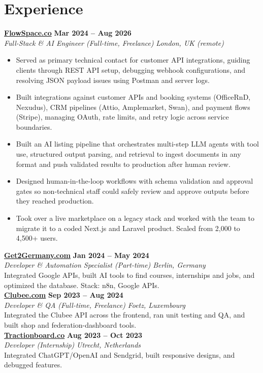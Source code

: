 \documentclass[a4paper,10pt]{article}
\newcommand{\role}[4]{%
 \textbf{#1} \hfill \textbf{#2}\\[1pt]%
 \textit{#3} \hfill \textit{#4}\\[2pt]%
}
\begin{document}
\section{Experience}

\role{\href{https://flowspace.co}{FlowSpace.co}}{Mar 2024 -- Aug 2026}{Full-Stack \& AI Engineer (Full-time, Freelance)}{London, UK (remote)}
\begin{itemize}
 \item Served as primary technical contact for customer API integrations, guiding clients through REST API setup, debugging webhook configurations, and resolving JSON payload issues using Postman and server logs.
 \item Built integrations against customer APIs and booking systems (OfficeRnD, Nexudus), CRM pipelines (Attio, Amplemarket, Swan), and payment flows (Stripe), managing OAuth, rate limits, and retry logic across service boundaries.
 \item Built an AI listing pipeline that orchestrates multi-step LLM agents with tool use, structured output parsing, and retrieval to ingest documents in any format and push validated results to production after human review.
 \item Designed human-in-the-loop workflows with schema validation and approval gates so non-technical staff could safely review and approve outputs before they reached production.
 \item Took over a live marketplace on a legacy stack and worked with the team to migrate it to a coded Next.js and Laravel product. Scaled from 2,000 to 4,500+ users.
\end{itemize}

\role{\href{https://get2germany.com}{Get2Germany.com}}{Jan 2024 -- May 2024}{Developer \& Automation Specialist (Part-time)}{Berlin, Germany}
Integrated Google APIs, built AI tools to find courses, internships and jobs, and optimized the database. Stack: n8n, Google APIs.\\[1pt]

\role{\href{https://clubee.com}{Clubee.com}}{Sep 2023 -- Aug 2024}{Developer \& QA (Full-time, Freelance)}{Foetz, Luxembourg}
Integrated the Clubee API across the frontend, ran unit testing and QA, and built shop and federation-dashboard tools.\\[1pt]

\role{\href{https://tractionboard.co}{Tractionboard.co}}{Aug 2023 -- Oct 2023}{Developer (Internship)}{Utrecht, Netherlands}
Integrated ChatGPT/OpenAI and Sendgrid, built responsive designs, and debugged features.
\end{document}
